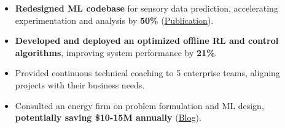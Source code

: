 {
}
\begin{itemize}
    \item \textbf{Redesigned ML codebase} for sensory data prediction, accelerating experimentation and analysis by \textbf{50\%} (\href{https://link.springer.com/article/10.1007/s10994-023-06413-x}{Publication}).
    \item \textbf{Developed and deployed an optimized offline RL and control algorithms}, improving system performance by \textbf{21\%}.
\end{itemize}

{
}

    
\begin{itemize}
    \item Provided continuous technical coaching to 5 enterprise teams, aligning projects with their business needs.
    \item Consulted an energy firm on problem formulation and ML design, \textbf{potentially saving \$10-15M annually} (\href{https://www.amii.ca/latest-from-amii/venturi-uses-machine-learning-reduce-emissions-increase-safety-pipelines/}{Blog}).
\end{itemize}

